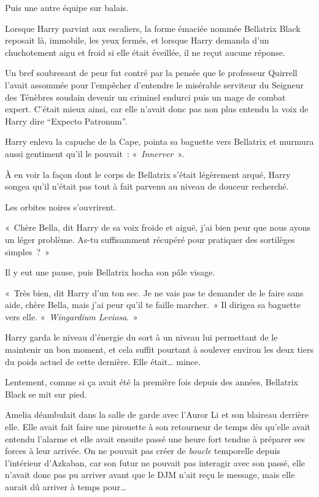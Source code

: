 Puis une autre équipe sur balais.

\later

Lorsque Harry parvint aux escaliers, la forme émaciée nommée Bellatrix Black reposait là, immobile, les yeux fermés, et lorsque Harry demanda d'un chuchotement aigu et froid si elle était éveillée, il ne reçut aucune réponse.

Un bref soubresaut de peur fut contré par la pensée que le professeur Quirrell l'avait assommée pour l'empêcher d'entendre le misérable serviteur du Seigneur des Ténèbres soudain devenir un criminel endurci puis un mage de combat expert.
C'était mieux ainsi, car elle n'avait donc pas non plus entendu la voix de Harry dire “Expecto Patronum”.

Harry enleva la capuche de la Cape, pointa sa baguette vers Bellatrix et murmura aussi gentiment qu'il le pouvait~: «~\emph{Innerver}~».

À en voir la façon dont le corps de Bellatrix s'était légèrement arqué, Harry songea qu'il n'était pas tout à fait parvenu au niveau de douceur recherché.

Les orbites noires s'ouvrirent.

«~Chère Bella, dit Harry de sa voix froide et aiguë, j'ai bien peur que nous ayons un léger problème.
As-tu suffisamment récupéré pour pratiquer des sortilèges simples~?~»

Il y eut une pause, puis Bellatrix hocha son pâle visage.

«~Très bien, dit Harry d'un ton sec.
Je ne vais pas te demander de le faire sans aide, chère Bella, mais j'ai peur qu'il te faille marcher.~»
Il dirigea sa baguette vers elle.
«~\emph{Wingardium Leviosa}.~»

Harry garda le niveau d'énergie du sort à un niveau lui permettant de le maintenir un bon moment, et cela suffit pourtant à soulever environ les deux tiers du poids actuel de cette dernière.
Elle était… mince.

Lentement, comme si ça avait été la première fois depuis des années, Bellatrix Black se mit sur pied.

\later

Amelia déambulait dans la salle de garde avec l'Auror Li et son blaireau derrière elle.
Elle avait fait faire une pirouette à son retourneur de temps dès qu'elle avait entendu l'alarme et elle avait ensuite passé une heure fort tendue à préparer ses forces à leur arrivée.
On ne pouvait pas créer de \emph{boucle} temporelle depuis l'intérieur d'Azkaban, car son futur ne pouvait pas interagir avec son passé, elle n'avait donc pas pu arriver avant que le DJM n'ait reçu le message, mais elle aurait dû arriver à temps pour…

